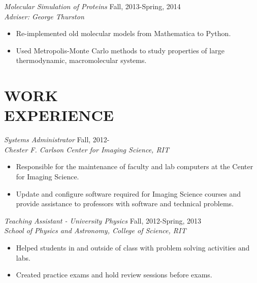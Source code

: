 \documentclass[margin]{res}
\begin{document}
\begin{resume}
  {\sl Molecular Simulation of Proteins} \hfill   Fall, 2013-Spring, 2014 \\
  {\sl Adviser: George Thurston}\\                
  \begin{itemize}
    \item Re-implemented old molecular models from Mathematica to Python.
    \item Used Metropolis-Monte Carlo methods to study 
      properties of large thermodynamic, macromolecular systems.
  \end{itemize}


\section{WORK\\EXPERIENCE}

  {\sl Systems Administrator} \hfill            Fall, 2012- \\
  {\sl Chester F. Carlson Center for Imaging Science, RIT}\\
  \begin{itemize}
    \item Responsible for the maintenance of faculty and lab computers
      at the Center for Imaging Science.
    \item Update and configure software required for Imaging Science courses
      and provide assistance to professors with software and technical problems.
  \end{itemize}

  {\sl Teaching Assistant - University Physics} \hfill            Fall, 2012-Spring, 2013 \\
  {\sl School of Physics and Astronomy, College of Science, RIT}\\
  \begin{itemize}
    \item Helped students in and outside of class with problem solving activities and labs.
    \item Created practice exams and hold review sessions before exams.
  \end{itemize}



\end{resume}
\end{document}
